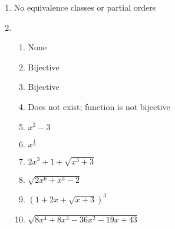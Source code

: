 \begin{enumerate}[leftmargin=2cm,labelsep=.5cm,label=\bf\arabic*.]
\item No equivalence classes or partial orders

\item
\begin{enumerate}
\item None
\item Bijective
\item Bijective
\item Does not exist; function is not bijective
\item $x^2-3$
\item $x^{\frac{1}{3}}$
\item $2x^3+1+\sqrt{x^3+3}$
\item $\sqrt{2x^6+x^3-2}$
\item $\left(1+2x+\sqrt{x+3}\right)^3$
\item $\sqrt{8x^4+8x^3-36x^2-19x+43}$
\end{enumerate}
\end{enumerate}
